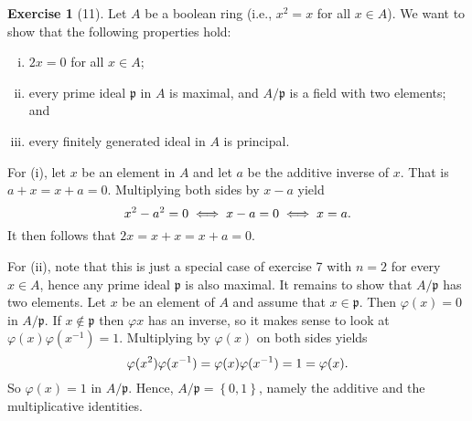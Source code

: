 \documentclass{article}
\theoremstyle{definition}
\newtheorem*{exercise}{Exercise}
\begin{document}
\begin{exercise}[11]
	Let $A$ be a boolean ring (i.e., $x^2 = x$ for all $x \in A$). We want
	to show that the following properties hold:
	\begin{enumerate}[(i)]
		\item $2x = 0$ for all $x \in A$;
		\item every prime ideal $\mathfrak{p}$ in $A$ is maximal, and
			$A / \mathfrak{p}$ is a field with two elements; and
		\item every finitely generated ideal in $A$ is principal.
	\end{enumerate}
	For (i), let $x$ be an element in $A$ and let $a$ be the additive
	inverse of $x$. That is $a + x = x + a = 0$. Multiplying both sides by
	$x - a$ yield
	\begin{equation}
		\notag
		x^2 - a^2 = 0 \iff x - a = 0 \iff x = a.
	\end{equation}
	It then follows that $2x = x + x = x + a = 0$.

	For (ii), note that this is just a special case of exercise 7 with $n =
	2$ for every $x \in A$, hence any prime ideal $\mathfrak{p}$ is also
	maximal. It remains to show that $A / \mathfrak{p}$ has two elements.
	Let $x$ be an element of $A$ and assume that $x \in \mathfrak{p}$. Then
	$\varphi(x) = 0$ in $A / \mathfrak{p}$. If $x \notin \mathfrak{p}$ then
	$\varphi{x}$ has an inverse, so it makes sense to look at
	$\varphi(x)\varphi(x^{-1}) = 1$. Multiplying by $\varphi(x)$ on both
	sides yields
	\begin{equation}
		\notag
		\varphi(x^2)\varphi(x^{-1}) = \varphi(x)\varphi(x^{-1}) = 1 = \varphi(x).
	\end{equation}
	So $\varphi(x) = 1$ in $A / \mathfrak{p}$. Hence, $A / \mathfrak{p} =
	\left\{0, 1\right\}$, namely the additive and the multiplicative
	identities.
\end{exercise}
\end{document}
